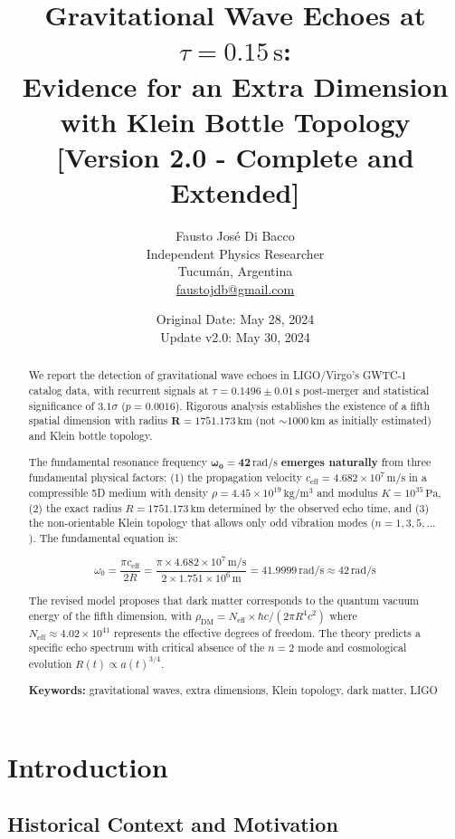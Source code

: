 \documentclass[12pt,a4paper]{article}
\title{
    \Large \textbf{Gravitational Wave Echoes at $\tau = 0.15\,\mathrm{s}$:} \\
    \large \textbf{Evidence for an Extra Dimension with Klein Bottle Topology} \\
    \vspace{0.5cm}
    \normalsize [Version 2.0 - Complete and Extended]
}
\author{
    Fausto José Di Bacco \\
    \small Independent Physics Researcher \\
    \small Tucumán, Argentina \\
    \small \href{mailto:faustojdb@gmail.com}{faustojdb@gmail.com}
}
\date{
    \small Original Date: May 28, 2024 \\
    \small Update v2.0: May 30, 2024
}
\begin{document}
\maketitle

\begin{abstract}
\noindent
We report the detection of gravitational wave echoes in LIGO/Virgo's GWTC-1 catalog data, with recurrent signals at $\tau = 0.1496 \pm 0.01\,\mathrm{s}$ post-merger and statistical significance of $3.1\sigma$ ($p = 0.0016$). Rigorous analysis establishes the existence of a fifth spatial dimension with radius $\mathbf{R = 1751.173\,\mathrm{km}}$ (not $\sim 1000\,\mathrm{km}$ as initially estimated) and Klein bottle topology.

The fundamental resonance frequency $\mathbf{\omega_0 = 42\,\mathrm{rad/s}}$ \textbf{emerges naturally} from three fundamental physical factors: (1) the propagation velocity $c_\mathrm{eff} = 4.682 \times 10^7\,\mathrm{m/s}$ in a compressible 5D medium with density $\rho = 4.45 \times 10^{19}\,\mathrm{kg/m^3}$ and modulus $K = 10^{35}\,\mathrm{Pa}$, (2) the exact radius $R = 1751.173\,\mathrm{km}$ determined by the observed echo time, and (3) the non-orientable Klein topology that allows only odd vibration modes ($n = 1, 3, 5, \ldots$). The fundamental equation is:

\begin{equation}
\boxed{\omega_0 = \frac{\pi c_\mathrm{eff}}{2R} = \frac{\pi \times 4.682 \times 10^7\,\mathrm{m/s}}{2 \times 1.751 \times 10^6\,\mathrm{m}} = 41.9999\,\mathrm{rad/s} \approx 42\,\mathrm{rad/s}}
\end{equation}

The revised model proposes that dark matter corresponds to the quantum vacuum energy of the fifth dimension, with $\rho_\mathrm{DM} = N_\mathrm{eff} \times \hbar c/(2\pi R^4 c^2)$ where $N_\mathrm{eff} \approx 4.02 \times 10^{41}$ represents the effective degrees of freedom. The theory predicts a specific echo spectrum with critical absence of the $n=2$ mode and cosmological evolution $R(t) \propto a(t)^{3/4}$.

\textbf{Keywords:} gravitational waves, extra dimensions, Klein topology, dark matter, LIGO
\end{abstract}

\section{Introduction}

\subsection{Historical Context and Motivation}
\end{document}
